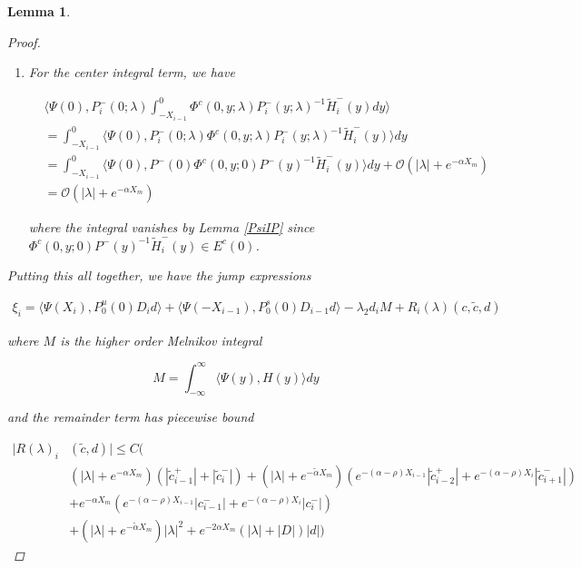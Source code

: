 \documentclass[12pt]{article}
\newtheorem{lemma}{Lemma}
\begin{document}
\begin{lemma}
\begin{proof}
\begin{enumerate}
where we absorbed the $e^{-(\alpha - 2 \rho) X_i}|c_i^-|$ term into the lower order term $|\tilde{c}_i^-|$.

\item For the center integral term, we have

\begin{align*}
&\langle \Psi(0), P_i^-(0; \lambda)
\int_{-X_{i-1}}^0 \Phi^c(0, y; \lambda) P_i^-(y; \lambda)^{-1} \tilde{H}_i^-(y) dy \rangle \\
&= \int_{-X_{i-1}}^0 \langle \Psi(0), P_i^-(0; \lambda) \Phi^c(0, y; \lambda) P_i^-(y; \lambda)^{-1} \tilde{H}_i^-(y) \rangle dy \\
&= \int_{-X_{i-1}}^0 \langle \Psi(0), P^-(0) \Phi^c(0, y; 0) P^-(y)^{-1} \tilde{H}_i^-(y) \rangle dy + \mathcal{O}(|\lambda| + e^{-\alpha X_m}) \\
&= \mathcal{O}(|\lambda| + e^{-\alpha X_m})
\end{align*}

where the integral vanishes by Lemma \ref{PsiIP} since $\Phi^c(0, y; 0) P^-(y)^{-1} \tilde{H}_i^-(y) \in E^c(0)$.

\end{enumerate}

Putting this all together, we have the jump expressions

\begin{align*}
\xi_i = \langle \Psi(X_i), P_0^u(0) D_i d \rangle
+ \langle \Psi(-X_{i-1}), P_0^s(0) D_{i-1} d \rangle 
- \lambda_2 d_i M + R_i(\lambda)(c, \tilde{c}, d)
\end{align*}

where $M$ is the higher order Melnikov integral

\[
M = \int_{-\infty}^\infty \langle \Psi(y), H(y) \rangle dy 
\]

and the remainder term has piecewise bound

\begin{align*}
|R(\lambda)_i&(\tilde{c}, d)| \leq C \Big( \\
&(|\lambda| + e^{-\alpha X_m})(|\tilde{c}_{i-1}^+| + |\tilde{c}_{i}^-|) + (|\lambda| + e^{-\tilde{\alpha} X_m})( e^{-(\alpha - \rho) X_{i-1}}|\tilde{c}_{i-2}^+| + e^{-(\alpha - \rho) X_i}|\tilde{c}_{i+1}^-|)  \\
&+ e^{-\alpha X_m}( e^{-(\alpha - \rho) X_{i-1}} |c_{i-1}^-| + e^{-(\alpha - \rho) X_i} |c_i^-|) \\
&+ (|\lambda| + e^{-\tilde{\alpha} X_m})|\lambda|^2 + e^{-2 \alpha X_m}(|\lambda| + |D|)|d| \Big)
\end{align*}


\end{proof}
\end{lemma}
\end{document}
